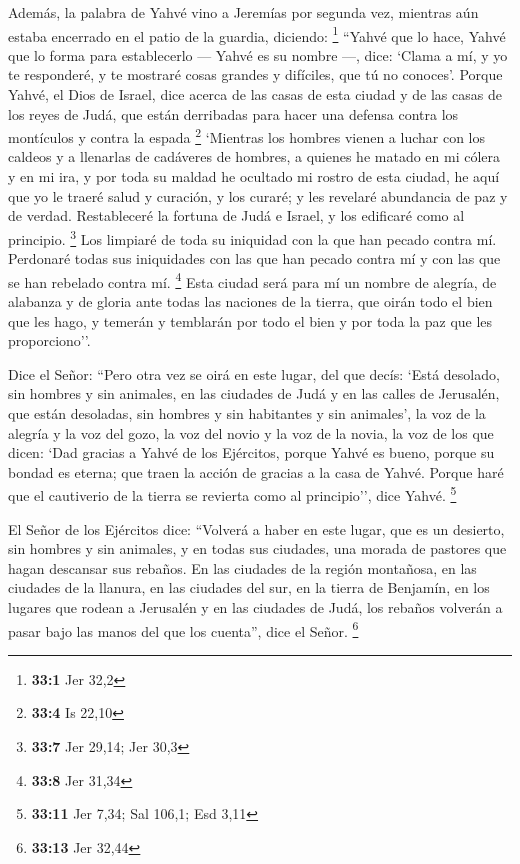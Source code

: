 \begin{paracol}{2}
 Además, la palabra de Yahvé vino a Jeremías por segunda
vez, mientras aún estaba encerrado en el patio de la guardia, diciendo:
\footnote{\textbf{33:1} Jer 32,2}  ``Yahvé que lo hace,
Yahvé que lo forma para establecerlo --- Yahvé es su nombre ---, dice:
 `Clama a mí, y yo te responderé, y te mostraré cosas
grandes y difíciles, que tú no conoces'.  Porque Yahvé, el
Dios de Israel, dice acerca de las casas de esta ciudad y de las casas
de los reyes de Judá, que están derribadas para hacer una defensa contra
los montículos y contra la espada \footnote{\textbf{33:4} Is 22,10}
 `Mientras los hombres vienen a luchar con los caldeos y a
llenarlas de cadáveres de hombres, a quienes he matado en mi cólera y en
mi ira, y por toda su maldad he ocultado mi rostro de esta ciudad,
 he aquí que yo le traeré salud y curación, y los curaré;
y les revelaré abundancia de paz y de verdad. 
Restableceré la fortuna de Judá e Israel, y los edificaré como al
principio. \footnote{\textbf{33:7} Jer 29,14; Jer 30,3} 
Los limpiaré de toda su iniquidad con la que han pecado contra mí.
Perdonaré todas sus iniquidades con las que han pecado contra mí y con
las que se han rebelado contra mí. \footnote{\textbf{33:8} Jer 31,34}
 Esta ciudad será para mí un nombre de alegría, de
alabanza y de gloria ante todas las naciones de la tierra, que oirán
todo el bien que les hago, y temerán y temblarán por todo el bien y por
toda la paz que les proporciono''.

 Dice el Señor: ``Pero otra vez se oirá en este lugar,
del que decís: `Está desolado, sin hombres y sin animales, en las
ciudades de Judá y en las calles de Jerusalén, que están desoladas, sin
hombres y sin habitantes y sin animales',  la voz de la
alegría y la voz del gozo, la voz del novio y la voz de la novia, la voz
de los que dicen: `Dad gracias a Yahvé de los Ejércitos, porque Yahvé es
bueno, porque su bondad es eterna; que traen la acción de gracias a la
casa de Yahvé. Porque haré que el cautiverio de la tierra se revierta
como al principio'', dice Yahvé. \footnote{\textbf{33:11} Jer 7,34; Sal
  106,1; Esd 3,11}

 El Señor de los Ejércitos dice: ``Volverá a haber en
este lugar, que es un desierto, sin hombres y sin animales, y en todas
sus ciudades, una morada de pastores que hagan descansar sus rebaños.
 En las ciudades de la región montañosa, en las ciudades
de la llanura, en las ciudades del sur, en la tierra de Benjamín, en los
lugares que rodean a Jerusalén y en las ciudades de Judá, los rebaños
volverán a pasar bajo las manos del que los cuenta'', dice el Señor.
\footnote{\textbf{33:13} Jer 32,44}


\end{paracol}
